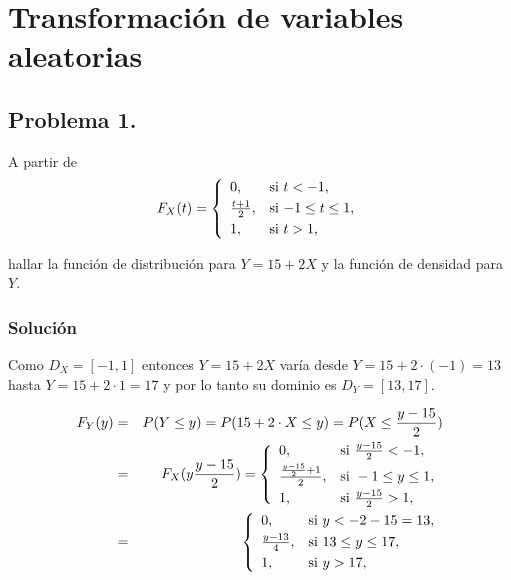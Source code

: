 \documentclass[
]{article}
\begin{document}
\hypertarget{transformaciuxf3n-de-variables-aleatorias}{%
\section{Transformación de variables
aleatorias}\label{transformaciuxf3n-de-variables-aleatorias}}

\hypertarget{problema-1.-2}{%
\subsection{Problema 1.}\label{problema-1.-2}}

A partir de \[
F_X(t)=
\left\{\begin{array}{ll}
0, & \mbox{si $t<-1$},
\\[0.1cm]
{t+1\over 2}, & \mbox{si $-1\leq t\leq
1$},
 \\[0.1cm]
1, & \mbox{si $t>1$},
\end{array}\right.
\]

hallar la función de distribución para \(Y=15+2X\) y la función de
densidad para \(Y\).

\hypertarget{soluciuxf3n-11}{%
\subsubsection{Solución}\label{soluciuxf3n-11}}

Como \(D_X=[-1,1]\) entonces \(Y=15+2 X\) varía desde
\(Y=15+2\cdot (-1)=13\) hasta \(Y=15+2\cdot 1=17\) y por lo tanto su
dominio es \(D_Y=[13,17].\)

\begin{eqnarray*}
F_Y(y)&=& P(Y\leq y) =P(15+2\cdot X\leq y )=P(X\leq \frac{y-15}{2})
\\&=& 
F_X(y\frac{y-15}{2})=
\left\{\begin{array}{ll}
0, & \mbox{si } \frac{y-15}{2}<-1,
\\[0.1cm]
{\frac{y-15}{2}+1\over 2}, & \mbox{si } -1\leq y \leq
1,
 \\[0.1cm]
1, & \mbox{si } \frac{y-15}{2}>1,
\end{array}\right.
\\&=& 
\left\{\begin{array}{ll}
0, & \mbox{si } y<-2-15=13
,
\\[0.1cm]
\frac{y-13}{4}, & \mbox{si } 13\leq y \leq
17,
 \\[0.1cm]
1, & \mbox{si } y>17,
\end{array}\right.
\end{eqnarray*}
\end{document}
